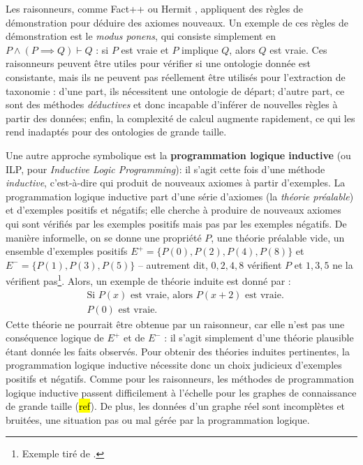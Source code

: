 Les raisonneurs, comme Fact++ \cite{tsarkov2006fact++} ou Hermit \cite{glimm2014hermit}, appliquent des règles de démonstration pour déduire des axiomes nouveaux. Un exemple de ces règles de démonstration est le \textit{modus ponens}, qui consiste simplement en $P \land (P \implies Q) \vdash Q$ : si $P$ est vraie et $P$ implique $Q$, alors $Q$ est vraie. Ces raisonneurs peuvent être utiles pour vérifier si une ontologie donnée est consistante, mais ils ne peuvent pas réellement être utilisés pour l'extraction de taxonomie : 
d'une part, ils nécessitent une ontologie de départ; d'autre part, ce sont des méthodes \textit{déductives} et donc incapable d'inférer de nouvelles règles à partir des données; enfin, la complexité de calcul augmente rapidement, ce qui les rend inadaptés pour des ontologies de grande taille.

Une autre approche symbolique est la \textbf{programmation logique inductive} (ou ILP, pour \textit{Inductive Logic Programming}): il s'agit cette fois d'une méthode \textit{inductive}, c'est-à-dire qui produit de nouveaux axiomes à partir d'exemples. La programmation logique inductive part d'une série d'axiomes (la \textit{théorie préalable}) et d'exemples positifs et négatifs; elle cherche à produire de nouveaux axiomes qui sont vérifiés par les exemples positifs  mais pas par les exemples négatifs. De manière informelle, on se donne une propriété $P$, une théorie préalable vide, un ensemble d'exemples positifs $E^+=\{P(0), P(2), P(4), P(8) \}$ et $E^- = \{ P(1), P(3), P(5) \}$ – autrement dit, $0, 2, 4, 8$ vérifient $P$ et $1, 3, 5$ ne la vérifient pas\footnote{Exemple tiré de \cite{nienhuys1997foundations}.}. Alors, un exemple de théorie induite est donné par :
\begin{align}
    & \textrm{Si } P(x) \textrm{ est vraie, alors } P(x + 2) \textrm{ est vraie.} \\
    & P(0) \textrm{ est vraie.}
\end{align}
Cette théorie ne pourrait être obtenue par un raisonneur, car elle n'est pas une conséquence logique de $E^+$ et de $E^-$ : il s'agit simplement d'une théorie plausible étant donnée les faits observés. Pour obtenir des théories induites pertinentes, la programmation logique inductive nécessite donc un choix judicieux d'exemples positifs et négatifs. Comme pour les raisonneurs, les méthodes de programmation logique inductive passent difficilement à l'échelle pour les graphes de connaissance de grande taille (\hl{ref}). De plus, les données d'un graphe réel sont incomplètes et bruitées, une situation pas ou mal gérée par la programmation logique. 

